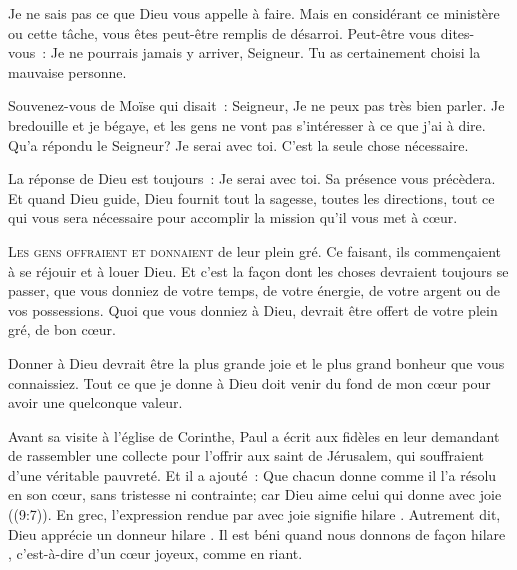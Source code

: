 
Je ne sais pas ce que Dieu vous appelle à faire.
 Mais en considérant ce ministère ou cette tâche,
 vous êtes peut-être remplis de désarroi. Peut-être vous dites-vous~:
 \og Je ne pourrais jamais y arriver, Seigneur.
 Tu as certainement choisi la mauvaise personne. \fg{}

Souvenez-vous de Moïse qui disait~:
 \og Seigneur, Je ne peux pas très bien parler. Je bredouille et je bégaye,
 et les gens ne vont pas s'intéresser à ce que j'ai à dire. \fg{}
 Qu'a répondu le Seigneur? \og Je serai avec toi. \fg{}
 C'est la seule chose nécessaire.

La réponse de Dieu est toujours~: \og Je serai avec toi. \fg{}
 Sa présence vous précèdera.
 Et quand Dieu guide, Dieu fournit tout la sagesse, toutes les directions,
 tout ce qui vous sera nécessaire pour accomplir
 la mission qu'il vous met à c\oe{}ur.

\dvrule






\lettrine{L}{es gens offraient et donnaient} de leur plein gré.
 Ce faisant, ils commençaient à se réjouir et à louer Dieu.
 Et c'est la façon dont les choses devraient toujours se passer,
 que vous donniez de votre temps, de votre énergie, de votre argent
 ou de vos possessions.
 Quoi que vous donniez à Dieu, devrait être offert de votre plein gré,
 de bon c\oe{}ur. 

Donner à Dieu devrait être la plus grande joie et le plus grand bonheur
 que vous connaissiez.
 Tout ce que je donne à Dieu doit venir du fond de mon c\oe{}ur
 pour avoir une quelconque valeur. 


Avant sa visite à l'église de Corinthe, Paul a écrit aux fidèles
 en leur demandant de rassembler une collecte pour l'offrir
 aux saint de Jérusalem, qui souffraient d'une véritable pauvreté.
 Et il a ajouté~:
 \og Que chacun donne comme il l'a résolu en son cœur, sans tristesse
 ni contrainte; car Dieu aime celui qui donne avec joie \fg{}
 ((9:7)).
 En grec, l'expression rendue par \og avec joie \fg{} signifie
 \og hilare \fg{}. Autrement dit, Dieu apprécie un \og donneur hilare \fg{}.
 Il est béni quand nous donnons de façon \og hilare \fg{},
 c'est-à-dire d'un c\oe{}ur joyeux, comme en riant. 

